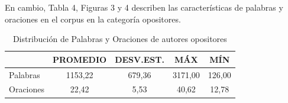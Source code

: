 \documentclass[a4paper,10pt]{article}
\begin{document}
\hspace{0.5cm}
 En cambio, Tabla 4, Figuras 3 y 4 describen las características de palabras y oraciones en el corpus en la categoría opositores.

\begin{table}[htbp]
	\centering
	\begin{tabular}{lcccc}
	\cmidrule{2-5}  
	\multicolumn{1}{r}{} & \multicolumn{1}{l}{PROMEDIO} & \multicolumn{1}{l}{DESV.EST.} & MÁX   & MÍN \\
		\midrule
	Palabras & 1153,22 & 679,36 & 3171,00 & 126,00 \\
	Oraciones & 22,42 & 5,53 & 40,62 & 12,78 \\
	\bottomrule
	\end{tabular}%
	\caption{\label{tab:tabla4}Distribución de Palabras y Oraciones de autores opositores}%
\end{table}%
\hspace{0.1cm}
\vspace{-0.5cm}
\end{document}
